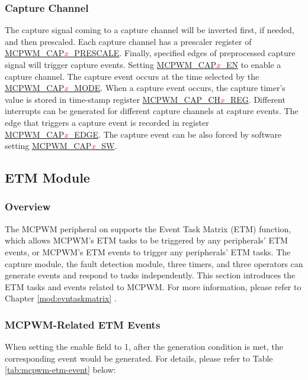 \documentclass[main\_\_EN.tex]{subfiles}
\begin{document}
\subsubsection{Capture Channel}
The capture signal coming to a capture channel will be inverted first, if needed, and then prescaled. Each capture channel has a prescaler register of \hyperref[fielddesc:MCPWMCAP0PRESCALE]{MCPWM\_CAP\textcolor{red}{\it{x}}\_PRESCALE}. Finally, specified edges of preprocessed capture signal will trigger capture events. Setting \hyperref[fielddesc:MCPWMCAP0EN]{MCPWM\_CAP\textcolor{red}{\it{x}}\_EN} to enable a capture channel. The capture event occurs at the time selected by the \hyperref[fielddesc:MCPWMCAP0MODE]{MCPWM\_CAP\textcolor{red}{\it{x}}\_MODE}. When a capture event occurs, the capture timer's value is stored in time-stamp register \hyperref[regdesc:MCPWMCAPCH0REG]{MCPWM\_CAP\_CH\textcolor{red}{\it{x}}\_REG}. Different interrupts can be generated for different capture channels at capture events. The edge that triggers a capture event is recorded in register \hyperref[fielddesc:MCPWMCAP0EDGE]{MCPWM\_CAP\textcolor{red}{\it{x}}\_EDGE}. The capture event can be also forced by software setting \hyperref[fielddesc:MCPWMCAP0SW]{MCPWM\_CAP\textcolor{red}{\it{x}}\_SW}.

\subsection{ETM Module}

\subsubsection{Overview}
The MCPWM peripheral on \chipname{} supports the Event Task Matrix (ETM) function, which allows MCPWM's ETM tasks to be triggered by any peripherals' ETM events, or MCPWM's ETM events to trigger any peripherals' ETM tasks. The capture module, the fault detection module, three timers, and three operators can generate events and respond to tasks independently. This section introduces the ETM tasks and events related to MCPWM. For more information, please refer to Chapter \ref{mod:evntaskmatrix} .

\subsubsection{MCPWM-Related ETM Events}

When setting the enable field to 1, after the generation condition is met, the corresponding event would be generated. For details, please refer to Table \ref{tab:mcpwm-etm-event} below:
\end{document}
